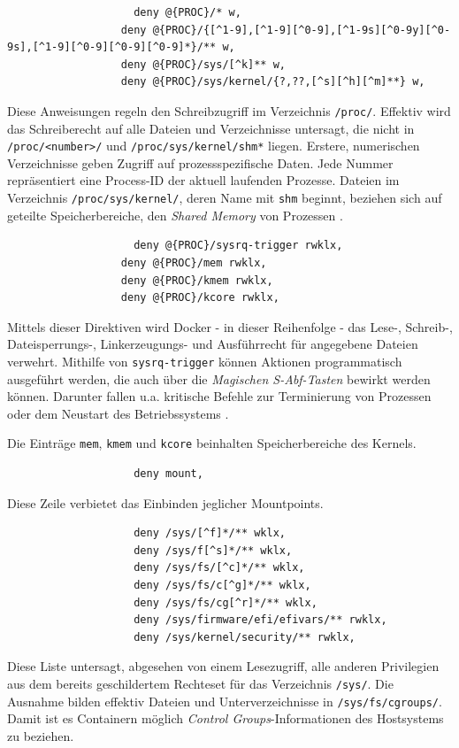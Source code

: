 \documentclass[../main.tex]{subfiles}
\begin{document}
				\begin{lstlisting}
					deny @{PROC}/* w,
				  deny @{PROC}/{[^1-9],[^1-9][^0-9],[^1-9s][^0-9y][^0-9s],[^1-9][^0-9][^0-9][^0-9]*}/** w,
				  deny @{PROC}/sys/[^k]** w,
				  deny @{PROC}/sys/kernel/{?,??,[^s][^h][^m]**} w,
				\end{lstlisting}
				Diese Anweisungen regeln den Schreibzugriff im Verzeichnis \texttt{/proc/}. Effektiv wird das Schreiberecht auf alle Dateien und Verzeichnisse untersagt, die nicht in \texttt{/proc/<number>/} und \texttt{/proc/sys/kernel/shm*} liegen. Erstere, numerischen Verzeichnisse geben Zugriff auf prozessspezifische Daten. Jede Nummer repräsentiert eine Process-ID der aktuell laufenden Prozesse. Dateien im Verzeichnis \texttt{/proc/sys/kernel/}, deren Name mit \texttt{shm} beginnt, beziehen sich auf geteilte Speicherbereiche, den \emph{Shared Memory} von Prozessen \cite{apparmorShm}.

				\begin{lstlisting}
					deny @{PROC}/sysrq-trigger rwklx,
				  deny @{PROC}/mem rwklx,
				  deny @{PROC}/kmem rwklx,
				  deny @{PROC}/kcore rwklx,
				\end{lstlisting}
				Mittels dieser Direktiven wird Docker - in dieser Reihenfolge - das Lese-, Schreib-, Dateisperrungs-, Linkerzeugungs- und Ausführrecht für angegebene Dateien verwehrt. Mithilfe von \texttt{sysrq-trigger} können Aktionen programmatisch ausgeführt werden, die auch über die \emph{Magischen S-Abf-Tasten} bewirkt werden können. Darunter fallen u.a. kritische Befehle zur Terminierung von Prozessen oder dem Neustart des Betriebssystems \cite{apparmorMagicSysRQ}\cite{apparmorSysrqTrigger}.

				Die Einträge \texttt{mem}, \texttt{kmem} und \texttt{kcore} beinhalten Speicherbereiche des Kernels.

				\begin{lstlisting}
					deny mount,
				\end{lstlisting}
				Diese Zeile verbietet das Einbinden jeglicher Mountpoints.

				\begin{lstlisting}
					deny /sys/[^f]*/** wklx,
					deny /sys/f[^s]*/** wklx,
					deny /sys/fs/[^c]*/** wklx,
					deny /sys/fs/c[^g]*/** wklx,
					deny /sys/fs/cg[^r]*/** wklx,
					deny /sys/firmware/efi/efivars/** rwklx,
					deny /sys/kernel/security/** rwklx,
				\end{lstlisting}
				Diese Liste untersagt, abgesehen von einem Lesezugriff, alle anderen Privilegien aus dem bereits geschildertem Rechteset für das Verzeichnis \texttt{/sys/}. Die Ausnahme bilden effektiv Dateien und Unterverzeichnisse in \texttt{/sys/fs/cgroups/}. Damit ist es Containern möglich \emph{Control Groups}-Informationen des Hostsystems zu beziehen.
\end{document}
